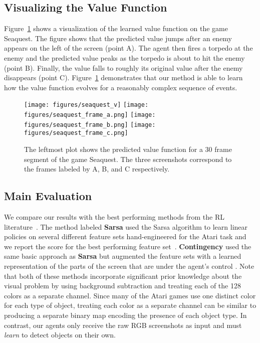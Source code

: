 \documentclass{article} \usepackage{nips13submit_e,times}
\begin{document}
\subsection{Visualizing the Value Function}
Figure~\ref{fig-reward} shows a visualization of the learned value function on the game Seaquest.  The figure shows that the predicted value jumps after an enemy appears on the left of the screen (point A). The agent then fires a torpedo at the enemy and the predicted value peaks as the torpedo is about to hit the enemy (point B). Finally, the value falls to roughly its original value after the enemy disappears (point C).  Figure~\ref{fig-reward} demonstrates that our method is able to learn how the value function evolves for a reasonably complex sequence of events. 


\begin{figure}
\texttt{[image: figures/seaquest\_v]}
\texttt{[image: figures/seaquest\_frame\_a.png]}
\texttt{[image: figures/seaquest\_frame\_b.png]}
\texttt{[image: figures/seaquest\_frame\_c.png]}
\caption{\label{fig-reward} The leftmost plot shows the predicted value function for a 30 frame segment of the game Seaquest.  The three screenshots correspond to the frames labeled by A, B, and C respectively.}
\end{figure}

\subsection{Main Evaluation}

We compare our results with the best performing methods from the RL literature~\cite{bellemare-ale,bellemare-contingency}.  The method labeled \textbf{Sarsa} used the Sarsa algorithm to learn linear policies on several different feature sets hand-engineered for the Atari task and we report the score for the best performing feature set~\cite{bellemare-ale}.  \textbf{Contingency} used the same basic approach as \textbf{Sarsa} but augmented the feature sets with a learned representation of the parts of the screen that are under the agent's control \cite{bellemare-contingency}.  Note that both of these methods incorporate significant prior knowledge about the visual problem by using background subtraction and treating each of the 128 colors as a separate channel.  Since many of the Atari games use one distinct color for each type of object, treating each color as a separate channel can be similar to producing a separate binary map encoding the presence of each object type.  In contrast, our agents only receive the raw RGB screenshots as input and must \emph{learn} to detect objects on their own.   
\end{document}
